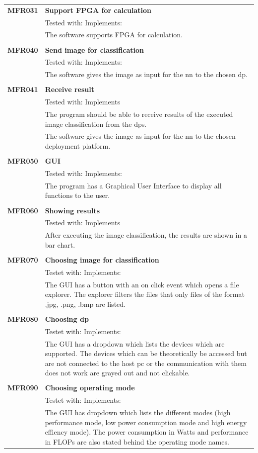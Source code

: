 \documentclass[parskip=full]{scrartcl}
\begin{document}
\newpage
\begin{tabular}{p{2cm}p{12cm}}
\textbf {MFR031} & \textbf{Support FPGA for calculation} \\
& Tested with: Implements: \\
& The software supports FPGA for calculation. \\
& \\
\textbf {MFR040} & \textbf{Send image for classification} \\
& Tested with: Implements: \\
& The software gives the image as input for the \gls{nn} to the chosen \gls{dp}. \\
& \\
\textbf {MFR041} & \textbf{Receive result} \\
& Tested with: Implements \\
& The program should be able to receive results of the executed \gls{image classification} from the \glspl{dp}. \\
& The software gives the image as input for the {nn} to the chosen deployment platform. \\
& \\
\textbf {MFR050} & \textbf{GUI} \\
& Tested with: Implements: \\
& The program has a Graphical User Interface to display all functions to the user. \\
& \\
\textbf {MFR060} & \textbf{Showing results} \\
& Tested with: Implements\\
& After executing the \gls{image classification}, the results are shown in a bar chart. \\
& \\
\textbf{MFR070} & \textbf{Choosing image for classification}\\
& Testet with: Implements: \\
& The GUI has a button with an on click event which opens a file explorer. The explorer filters the files that only files of the format .jpg, .png, .bmp are listed.\\
& \\
\textbf{MFR080} & \textbf{Choosing \gls{dp}}\\
& Testet with: Implements: \\
& The GUI has a dropdown which lists the devices which are supported. The devices which can be theoretically be accessed but are not connected to the \gls{host pc} or the communication with them does not work are grayed out and not clickable. \\
& \\
\textbf{MFR090} & \textbf{Choosing operating mode}\\
& Testet with: Implements: \\
& The GUI has dropdown which lists the different modes (high \gls{performance} mode, low \gls{power consumption} mode and high energy effiency mode). The \gls{power consumption} in Watts and \gls{performance} in FLOPs are also stated behind the operating mode names.
\end{tabular}
\end{document}
